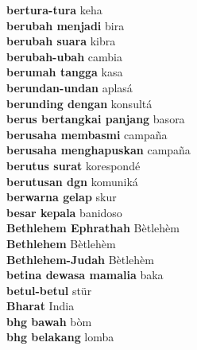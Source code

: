 \textbf{ bertura-tura  } keha \\
\textbf{ berubah menjadi  } bira \\
\textbf{ berubah suara  } kibra \\
\textbf{ berubah-ubah  } cambia \\
\textbf{ berumah tangga  } kasa \\
\textbf{ berundan-undan  } aplasá \\
\textbf{ berunding dengan  } konsultá \\
\textbf{ berus bertangkai panjang  } basora \\
\textbf{ berusaha membasmi  } campaña \\
\textbf{ berusaha menghapuskan  } campaña \\
\textbf{ berutus surat  } korespondé \\
\textbf{ berutusan dgn  } komuniká \\
\textbf{ berwarna gelap  } skur \\
\textbf{ besar kepala  } banidoso \\
\textbf{ Bethlehem Ephrathah  } Bètlehèm \\
\textbf{ Bethlehem  } Bètlehèm \\
\textbf{ Bethlehem-Judah  } Bètlehèm \\
\textbf{ betina dewasa mamalia  } baka \\
\textbf{ betul-betul  } stür \\
\textbf{ Bharat  } India \\
\textbf{ bhg bawah  } bòm \\
\textbf{ bhg belakang  } lomba \\
